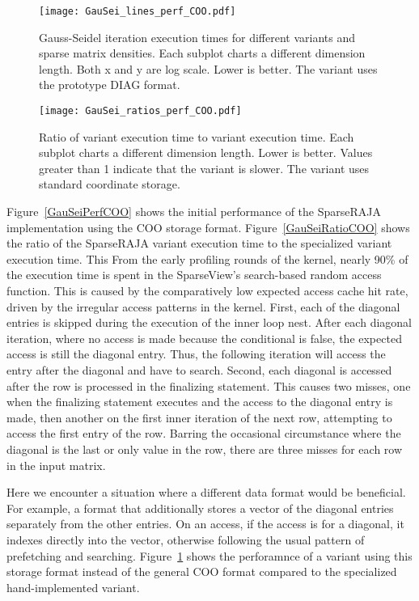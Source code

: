 \begin{figure}
\texttt{[image: GauSei\_lines\_perf\_COO.pdf]}
\caption{Gauss-Seidel iteration execution times for different variants and sparse matrix densities. Each subplot charts a different dimension length. Both x and y are log scale. Lower is better. The \sparseraja{} variant uses the prototype DIAG format.}
\label{GauSeiPerfDIAG}
\end{figure}
\begin{figure}
\texttt{[image: GauSei\_ratios\_perf\_COO.pdf]}
\caption{Ratio of \sparseraja{} variant execution time to \specialized{} variant execution time. Each subplot charts a different dimension length. Lower is better. Values greater than 1 indicate that the \sparseraja{} variant is slower. The \sparseraja{} variant uses standard coordinate storage.}
\label{GauSeiRatioDIAG}
\end{figure}
Figure~\ref{GauSeiPerfCOO} shows the initial performance of the SparseRAJA implementation using the COO storage format.
Figure~\ref{GauSeiRatioCOO} shows the ratio of the SparseRAJA variant execution time to the specialized variant execution time.
This 
From the early profiling rounds of the \GauSei kernel, nearly 90\% of the execution time is spent in the SparseView's search-based random access function.
This is caused by the comparatively low expected access cache hit rate, driven by the irregular access patterns in the kernel.
First, each of the diagonal entries is skipped during the execution of the inner loop nest.
After each diagonal iteration, where no access is made because the conditional is false, the expected access is still the diagonal entry. 
Thus, the following iteration will access the entry after the diagonal and have to search.
Second, each diagonal is accessed after the row is processed in the finalizing statement.
This causes two misses, one when the finalizing statement executes and the access to the diagonal entry is made, then another on the first inner iteration of the next row, attempting to access the first entry of the row.
Barring the occasional circumstance where the diagonal is the last or only value in the row, there are three misses for each row in the input matrix.

Here we encounter a situation where a different data format would be beneficial.
For example, a format that additionally stores a vector of the diagonal entries separately from the other entries.
On an access, if the access is for a diagonal, it indexes directly into the vector, otherwise following the usual pattern of prefetching and searching.
Figure~\ref{GauSeiPerfDIAG} shows the perforamnce of a variant using this storage format instead of the general COO format compared to the specialized hand-implemented variant.


